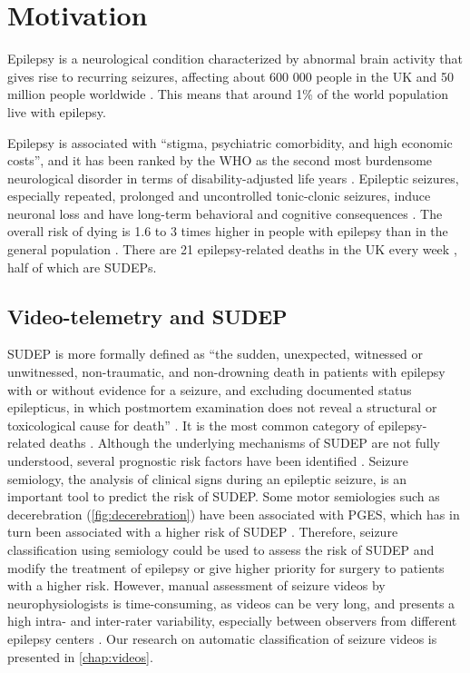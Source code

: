 \section{Motivation}

Epilepsy is a neurological condition characterized by abnormal brain activity that gives rise to recurring seizures, affecting about 600 000 people in the UK and 50 million people worldwide \cite{nice_epilepsies_2012,fiest_prevalence_2017}.
This means that around 1\% of the world population live with epilepsy.

Epilepsy is associated with ``stigma, psychiatric comorbidity, and high economic costs'', and it has been ranked by the \ac{WHO} as the second most burdensome neurological disorder in terms of disability-adjusted life years \cite{fiest_prevalence_2017}.
Epileptic seizures, especially repeated, prolonged and uncontrolled tonic-clonic seizures, induce neuronal loss and have long-term behavioral and cognitive consequences \cite{sutula_epileptic_2003}.
The overall risk of dying is 1.6 to 3 times higher in people with epilepsy than in the general population \cite{forsgren_mortality_2005}.
There are 21 epilepsy-related deaths in the UK every week%
,
half of which are \acp{SUDEP}.  %


\subsection{Video-telemetry and SUDEP}

\ac{SUDEP} is more formally defined as ``the sudden, unexpected, witnessed or unwitnessed, non-traumatic, and non-drowning death in patients with epilepsy with or without evidence for a seizure, and excluding documented status epilepticus, in which postmortem examination does not reveal a structural or toxicological cause for death'' \cite{nashef_sudden_1997}.
It is the most common category of epilepsy-related deaths \cite{devinsky_sudden_2016}.
Although the underlying mechanisms of \ac{SUDEP} are not fully understood, several prognostic risk factors have been identified \cite{so_what_2008, jha_sudden_2021}.
Seizure semiology, the analysis of clinical signs during an epileptic seizure, is an important tool to predict the risk of \ac{SUDEP}.
Some motor semiologies such as decerebration (\cref{fig:decerebration}) have been associated with \ac{PGES}, which has in turn been associated with a higher risk of \ac{SUDEP} \cite{alexandre_risk_2015,vilella_association_2021}.
Therefore, seizure classification using semiology could be used to assess the risk of \ac{SUDEP} and modify the treatment of epilepsy or give higher priority for surgery to patients with a higher risk.
However, manual assessment of seizure videos by neurophysiologists is time-consuming, as videos can be very long, and presents a high intra- and inter-rater variability, especially between observers from different epilepsy centers \cite{tufenkjian_seizure_2012}.
Our research on automatic classification of seizure videos is presented in \cref{chap:videos}.

